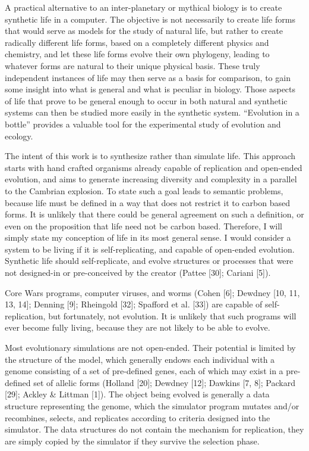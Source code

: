 A practical alternative to an inter-planetary or mythical biology is to
create synthetic life in a computer.  The objective is not necessarily
to create life forms that would serve as models for the study of natural
life, but rather to create radically different life forms, based on a
completely different physics and chemistry, and let these life forms
evolve their own phylogeny, leading to whatever forms are natural to their
unique physical basis.  These truly independent instances of life may
then serve as a basis for comparison, to gain some insight into what is
general and what is peculiar in biology.  Those aspects of life that prove
to be general enough to occur in both natural and synthetic systems can then
be studied more easily in the synthetic system.  ``Evolution in a bottle''
provides a valuable tool for the experimental study of evolution and ecology.

The intent of this work is to synthesize rather than simulate life.  This
approach starts with hand crafted organisms already capable of replication
and open-ended evolution, and aims to generate increasing diversity and
complexity in a parallel to the Cambrian explosion.  To state such a goal
leads to semantic problems, because life must be defined in a way that does
not restrict it to carbon based forms.  It is unlikely that there could be
general agreement on such a definition, or even on the proposition that life
need not be carbon based.  Therefore, I will simply state my conception of
life in its most general sense.  I would consider a system to be living if
it is self-replicating, and capable of open-ended evolution.  Synthetic life
should self-replicate, and evolve structures or processes that were not
designed-in or pre-conceived by the creator (Pattee [30]; Cariani [5]).

Core Wars programs, computer viruses, and worms (Cohen [6]; Dewdney [10,
11, 13, 14]; Denning [9]; Rheingold [32]; Spafford et al. [33]) are capable
of self-replication, but fortunately, not evolution.  It is unlikely that
such programs will ever become fully living, because they are not likely
to be able to evolve.

Most evolutionary simulations are not open-ended.  Their potential is limited
by the structure of the model, which generally endows each individual with a
genome consisting of a set of pre-defined genes, each of which may exist
in a pre-defined set of allelic forms (Holland [20]; Dewdney [12]; Dawkins
[7, 8]; Packard [29]; Ackley \& Littman [1]).  The object being evolved
is generally a data structure representing the genome, which the simulator
program mutates and/or recombines, selects, and replicates according to
criteria designed into the simulator.  The data structures do not contain the
mechanism for replication, they are simply copied by the simulator if they
survive the selection phase.

